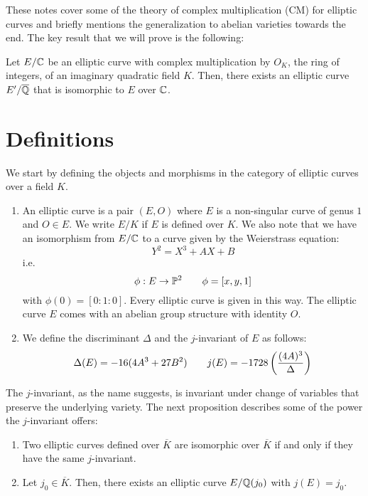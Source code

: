 \documentclass[12pt]{article}
\begin{document}



These notes cover some of the theory of complex multiplication (CM) for elliptic curves and briefly mentions the generalization to abelian varieties towards the end. The key result that we will prove is the following:

\begin{theorem*}{1}
    Let $E/\C$ be an elliptic curve with complex multiplication by $O_{K}$, the ring of integers, of an imaginary quadratic field $K$. Then, there exists an elliptic curve $E'/\overline{\Q}$ that is isomorphic to $E$ over $\C$. 
\end{theorem*}


\section{Definitions}

We start by defining the objects and morphisms in the category of elliptic curves over a field $K$. 

\begin{definition}
    \begin{enumerate}
        \item An elliptic curve is a pair $(E, O)$ where $E$ is a non-singular curve of genus $1$ and $O \in E$. We write $E/K$ if $E$ is defined over $K$. We also note that we have an isomorphism from $E/\C$ to a curve given by the Weierstrass equation:
        \[ Y^2 = X^3 +AX + B\]
        i.e.
        \[ \phi: E \to \P^2 \qquad \phi = [x,y, 1]\]
        with $\phi(0) = [0:1:0]$. Every elliptic curve is given in this way. The elliptic curve $E$ comes with an abelian group structure with identity $O$. 
        \item We define the discriminant $\Delta$ and the $j$-invariant of $E$ as follows:
        \[ \Delta(E) = -16(4A^3+27B^2) \qquad j(E) = -1728\fr{(4A)^3}{\Delta}\]
    \end{enumerate} 
\end{definition}

The $j$-invariant, as the name suggests, is invariant under change of variables that preserve the underlying variety. The next proposition describes some of the power the $j$-invariant offers:

\begin{prop}
    \begin{enumerate}
        \item Two elliptic curves defined over $\overline{K}$ are isomorphic over $\overline{K}$ if and only if they have the same $j$-invariant.
        \item Let $j_0 \in \overline{K}$. Then, there exists an elliptic curve $E/\Q(j_0)$ with $j(E) = j_0$.
    \end{enumerate}
\end{prop}
\end{document}
